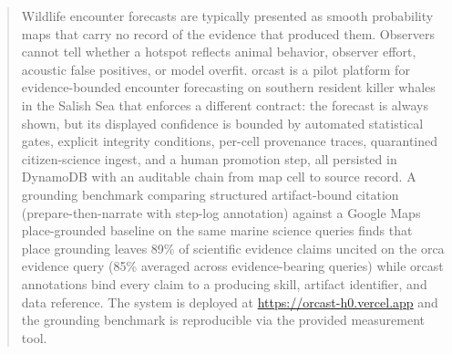 \begin{abstract}
Wildlife encounter forecasts are typically presented as smooth probability maps that carry no record of the evidence that produced them. Observers cannot tell whether a hotspot reflects animal behavior, observer effort, acoustic false positives, or model overfit. orcast is a pilot platform for evidence-bounded encounter forecasting on southern resident killer whales in the Salish Sea that enforces a different contract: the forecast is always shown, but its displayed confidence is bounded by automated statistical gates, explicit integrity conditions, per-cell provenance traces, quarantined citizen-science ingest, and a human promotion step, all persisted in DynamoDB with an auditable chain from map cell to source record. A grounding benchmark comparing structured artifact-bound citation (prepare-then-narrate with step-log annotation) against a Google Maps place-grounded baseline on the same marine science queries finds that place grounding leaves 89\% of scientific evidence claims uncited on the orca evidence query (85\% averaged across evidence-bearing queries) while orcast annotations bind every claim to a producing skill, artifact identifier, and data reference. The system is deployed at \url{https://orcast-h0.vercel.app} and the grounding benchmark is reproducible via the provided measurement tool.
\end{abstract}
